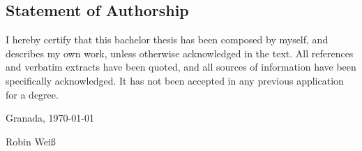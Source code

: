 \thispagestyle{empty}

\subsection*{Statement of Authorship}
I hereby certify that this bachelor thesis has been composed by myself, and describes my own work, unless otherwise acknowledged in the text. All references and verbatim extracts have been quoted, and all sources of information have been specifically acknowledged. It has not been accepted in any previous application for a degree.

\vspace{1cm}

\noindent 
Granada, \today
  
\vspace{2cm}

\noindent
Robin Weiß



